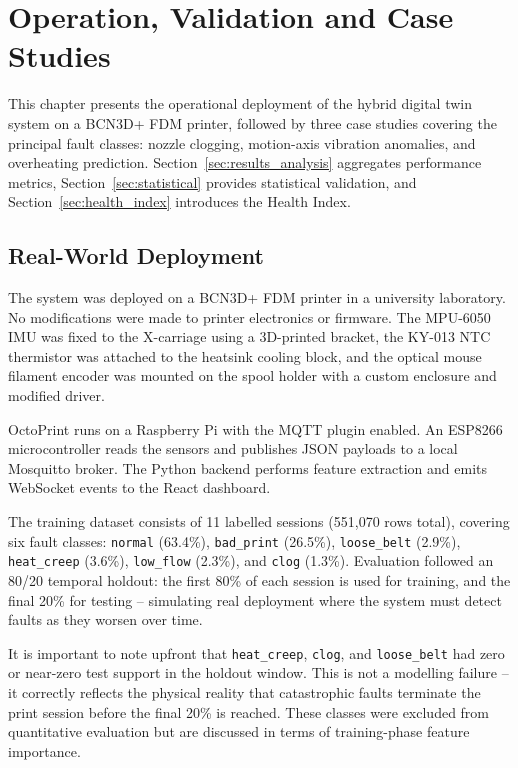 \chapter{Operation, Validation and Case Studies}
\label{chap:chapter5}

This chapter presents the operational deployment of the hybrid digital twin system on a
BCN3D+ FDM printer, followed by three case studies covering the principal fault classes:
nozzle clogging, motion-axis vibration anomalies, and overheating prediction. Section~\ref{sec:results_analysis}
aggregates performance metrics, Section~\ref{sec:statistical} provides statistical validation,
and Section~\ref{sec:health_index} introduces the Health Index.

\section{Real-World Deployment}
\label{sec:deployment}

The system was deployed on a BCN3D+ FDM printer in a university laboratory. No
modifications were made to printer electronics or firmware. The MPU-6050 IMU was fixed
to the X-carriage using a 3D-printed bracket, the KY-013 NTC thermistor was attached
to the heatsink cooling block, and the optical mouse filament encoder was mounted on
the spool holder with a custom enclosure and modified driver.

OctoPrint runs on a Raspberry Pi with the MQTT plugin enabled. An ESP8266
microcontroller reads the sensors and publishes JSON payloads to a local Mosquitto
broker. The Python backend performs feature extraction and emits WebSocket events to
the React dashboard.

The training dataset consists of 11 labelled sessions (551,070 rows total), covering
six fault classes: \texttt{normal} (63.4\%), \texttt{bad\_print} (26.5\%), \texttt{loose\_belt}
(2.9\%), \texttt{heat\_creep} (3.6\%), \texttt{low\_flow} (2.3\%), and \texttt{clog} (1.3\%).
Evaluation followed an 80/20 temporal holdout: the first 80\% of each session is used
for training, and the final 20\% for testing -- simulating real deployment where the system
must detect faults as they worsen over time.

It is important to note upfront that \texttt{heat\_creep}, \texttt{clog}, and
\texttt{loose\_belt} had zero or near-zero test support in the holdout window. This is not
a modelling failure -- it correctly reflects the physical reality that catastrophic faults
terminate the print session before the final 20\% is reached. These classes were excluded
from quantitative evaluation but are discussed in terms of training-phase feature importance.

